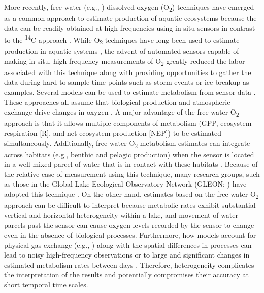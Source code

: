 \documentclass[12pt, oneside]{article}
\begin{document}
More recently, free-water (e.g., \citealt{Vachon_Sadro_2020}) dissolved oxygen (O\textsubscript{2}) techniques have emerged as a common approach to estimate production of aquatic ecosystems  because the data can be readily obtained at high frequencies using in situ sensors in contrast to the \textsuperscript{14}C approach . While O\textsubscript{2} techniques have long been used to estimate production in aquatic systems \citep{Sargent_Austin_1949, Odum_1956,staehr_lake_2010}, the advent of automated sensors capable of making in situ, high frequency measurements of O\textsubscript{2} greatly reduced the labor associated with this technique along with providing opportunities to gather the data during hard to sample time points such as storm events or ice breakup as examples. Several models can be used to estimate metabolism from sensor data
\citep{Cole_Pace_Carpenter_Kitchell_2000, Hanson_Carpenter_Kimura_Wu_Cornelius_Kratz_2008, Holtgrieve_Arias_Irvine_Lamberts_Ward_Kummu_Koponen_Sarkkula_Richey_2013, Batt_Carpenter_2012, solomon_ecosystem_2013, phillips_timevarying_2020}. These approaches all assume that biological production and atmospheric exchange drive changes in oxygen \citep{Odum_1956}. A major advantage of the free-water O\textsubscript{2} approach is that it allows multiple components of metabolism (GPP, ecosystem respiration [R], and net ecosystem production [NEP]) to be estimated simultaneously. Additionally, free-water O\textsubscript{2} metabolism estimates can integrate across habitats (e.g., benthic and pelagic production) when the sensor is located in a well-mixed parcel of water that is in contact with these habitats \citep{VandeBogert_Carpenter_Cole_Pace_2007}.  Because of the relative ease of measurement using this technique, many research groups, such as those in the Global Lake Ecological Observatory Network (GLEON; \citealt{Weathers_Hanson_2013}) have adopted this technique \citep{solomon_ecosystem_2013}. On the other hand, estimates based on the free-water O\textsubscript{2} approach can be difficult to interpret because metabolic rates exhibit substantial vertical \citep{Staehr_Christensen_Batt_Read_2012} and horizontal \citep{VandeBogert_Bade_Carpenter_Cole_Pace_Hanson_Langman_2012} heterogeneity within a lake, and movement of water parcels past the sensor can cause oxygen levels recorded by the sensor to change even in the absence of biological processes. Furthermore, how models account for physical gas exchange (e.g., \citealt{dugan_consequences_2016}) along with the spatial differences in processes can lead to noisy high-frequency observations \citep{Batt_Carpenter_2012} or to large and significant changes in estimated metabolism rates between days \citep{solomon_ecosystem_2013}. Therefore, heterogeneity complicates the interpretation of the results and potentially compromises their accuracy at short temporal time scales.
\end{document}
